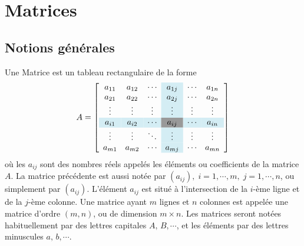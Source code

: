 \documentclass[12pt,a4paper]{book}
\numberwithin{definition}{chapter}
\theoremstyle{plain}
\begin{document}
\thispagestyle{empty}
\chapter{Matrices}
\section{Notions générales}
\begin{definition}
 Une Matrice est un tableau rectangulaire de la forme
 \begin{equation*}
 A = 
 \left[
 \begin{array}{ccc>{\columncolor{clight2}}c cc} 
 a_{11} & a_{12} & \cdots &  a_{1j} & \cdots & a_{1n}\\ 
 a_{21} & a_{22} & \cdots &  a_{2j} & \cdots & a_{2n}\\ 
 \vdots & \vdots &\vdots & \vdots & \vdots&\vdots \\
 \rowcolor{clight2} a_{i1} & a_{i2} & \cdots & \cellcolor[gray]{.6}a_{ij} & \cdots & a_{in}\\
 \vdots & \vdots &\ddots & \vdots & \vdots &\vdots \\
 a_{m1} & a_{m2} & \cdots & a_{mj} & \cdots & a_{mn}
 \end{array}
 \right]
 \end{equation*}
 où les $a_{ij}$ sont des nombres réels appelés les éléments ou coefficients de la matrice $A$. La matrice précédente est aussi notée par $\left(a_{ij}\right),\;i=1,\cdots,m,\;j=1,\cdots,n$, ou simplement par $\left(a_{ij}\right)$. L'élément $a_{ij}$ est situé à l’intersection de la $i$-ème ligne et de la $j$-ème colonne. Une matrice ayant $m$ lignes et $n$ colonnes
 est appelée une matrice d'ordre $(m,n)$, ou de dimension $m\times n$. Les matrices seront notées habituellement par des lettres capitales $A,\,B,\cdots$, et les éléments par des lettres minuscules $a,\,b,\cdots$.
\end{definition}
\end{document}
